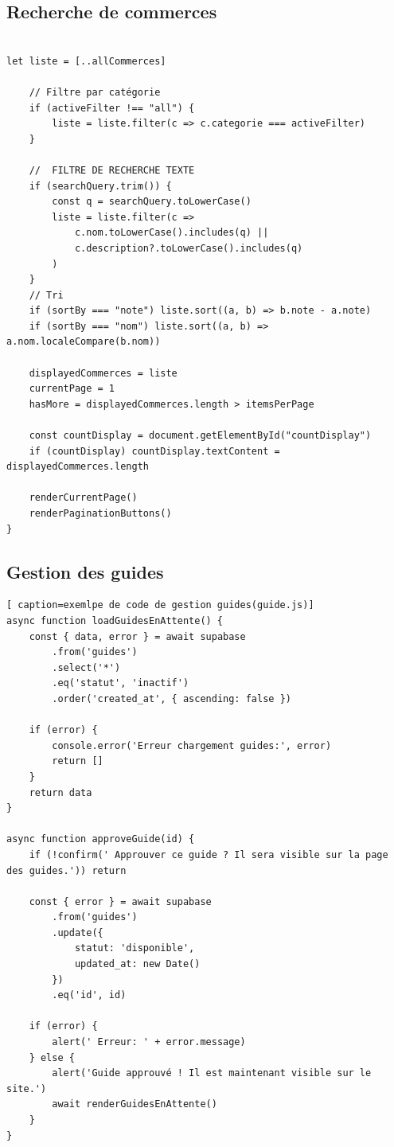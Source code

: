 \documentclass[12pt,a4paper]{report}
\begin{document}
\subsection{Recherche de commerces}
\begin{lstlisting}[caption=Rechercher des commerces (fichecomm.html)]

let liste = [..allCommerces]
    
    // Filtre par catégorie
    if (activeFilter !== "all") {
        liste = liste.filter(c => c.categorie === activeFilter)
    }
    
    //  FILTRE DE RECHERCHE TEXTE
    if (searchQuery.trim()) {
        const q = searchQuery.toLowerCase()
        liste = liste.filter(c =>
            c.nom.toLowerCase().includes(q) ||
            c.description?.toLowerCase().includes(q)
        )
    }
    // Tri
    if (sortBy === "note") liste.sort((a, b) => b.note - a.note)
    if (sortBy === "nom") liste.sort((a, b) => a.nom.localeCompare(b.nom))
    
    displayedCommerces = liste
    currentPage = 1
    hasMore = displayedCommerces.length > itemsPerPage
    
    const countDisplay = document.getElementById("countDisplay")
    if (countDisplay) countDisplay.textContent = displayedCommerces.length
    
    renderCurrentPage()
    renderPaginationButtons()
}
\end{lstlisting}

\subsection{Gestion des guides}
\begin{lstlisting}[ caption=exemlpe de code de gestion guides(guide.js)]
async function loadGuidesEnAttente() {
    const { data, error } = await supabase
        .from('guides')
        .select('*')
        .eq('statut', 'inactif')
        .order('created_at', { ascending: false })
    
    if (error) {
        console.error('Erreur chargement guides:', error)
        return []
    }
    return data
}

async function approveGuide(id) {
    if (!confirm(' Approuver ce guide ? Il sera visible sur la page des guides.')) return
    
    const { error } = await supabase
        .from('guides')
        .update({ 
            statut: 'disponible',
            updated_at: new Date()
        })
        .eq('id', id)
    
    if (error) {
        alert(' Erreur: ' + error.message)
    } else {
        alert('Guide approuvé ! Il est maintenant visible sur le site.')
        await renderGuidesEnAttente()
    }
}


\end{lstlisting}
\end{document}
